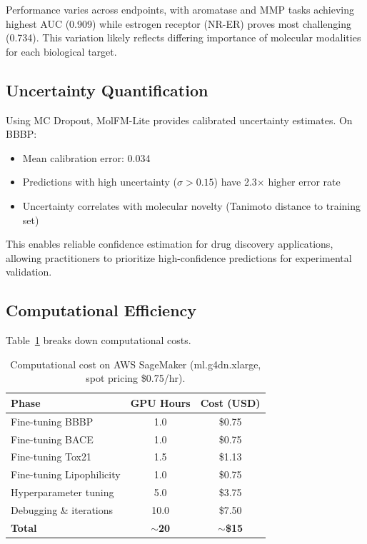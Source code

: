 \documentclass[11pt]{article}
\newcommand{\modelname}{MolFM-Lite}
\begin{document}
Performance varies across endpoints, with aromatase and MMP tasks achieving highest AUC (0.909) while estrogen receptor (NR-ER) proves most challenging (0.734). This variation likely reflects differing importance of molecular modalities for each biological target.

\subsection{Uncertainty Quantification}

Using MC Dropout, \modelname{} provides calibrated uncertainty estimates. On BBBP:
\begin{itemize}[leftmargin=*,itemsep=2pt]
    \item Mean calibration error: 0.034
    \item Predictions with high uncertainty ($\sigma > 0.15$) have 2.3$\times$ higher error rate
    \item Uncertainty correlates with molecular novelty (Tanimoto distance to training set)
\end{itemize}

This enables reliable confidence estimation for drug discovery applications, allowing practitioners to prioritize high-confidence predictions for experimental validation.

\subsection{Computational Efficiency}

Table~\ref{tab:compute} breaks down computational costs.

\begin{table}[t]
    \centering
    \caption{Computational cost on AWS SageMaker (ml.g4dn.xlarge, spot pricing \$0.75/hr).}
    \label{tab:compute}
    \begin{tabular}{lcc}
        \toprule
        \textbf{Phase} & \textbf{GPU Hours} & \textbf{Cost (USD)} \\
        \midrule
        Fine-tuning BBBP & 1.0 & \$0.75 \\
        Fine-tuning BACE & 1.0 & \$0.75 \\
        Fine-tuning Tox21 & 1.5 & \$1.13 \\
        Fine-tuning Lipophilicity & 1.0 & \$0.75 \\
        Hyperparameter tuning & 5.0 & \$3.75 \\
        Debugging \& iterations & 10.0 & \$7.50 \\
        \midrule
        \textbf{Total} & \textbf{$\sim$20} & \textbf{$\sim$\$15} \\
        \bottomrule
    \end{tabular}
\end{table}
\end{document}
